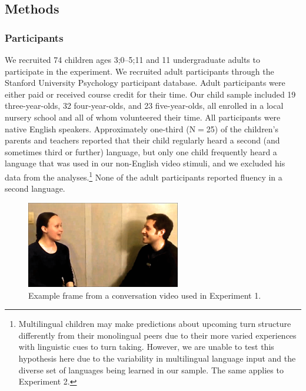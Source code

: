 \documentclass[authoryear, 12pt]{elsarticle}
\begin{document}
\subsection*{Methods}
\label{sec:methods1}

\subsubsection*{Participants}

We recruited 74 children ages 3;0--5;11 and 11 undergraduate adults to participate in the experiment. We recruited adult participants through the Stanford University Psychology participant database. Adult participants were either paid or received course credit for their time. Our child sample included 19 three-year-olds, 32 four-year-olds, and 23 five-year-olds, all enrolled in a local nursery school and all of whom volunteered their time. All participants were native English speakers. Approximately one-third (N$=$25) of the children's parents and teachers reported that their child regularly heard a second (and sometimes third or further) language, but only one child frequently heard a language that was used in our non-English video stimuli, and we excluded his data from the analyses.\footnote{Multilingual children may make predictions about upcoming turn structure differently from their monolingual peers due to their more varied experiences with linguistic cues to turn taking. However, we are unable to test this hypothesis here due to the variability in multilingual language input and the diverse set of languages being learned in our sample. The same applies to Experiment 2.} None of the adult participants reported fluency in a second language.

\begin{figure}[t]
\begin{center}
\includegraphics[width=0.6\textwidth]{figures/FIG-FL-stim.png}
\end{center}
\caption{Example frame from a conversation video used in Experiment 1.}
\label{fig:speakers}
\end{figure}
\end{document}
